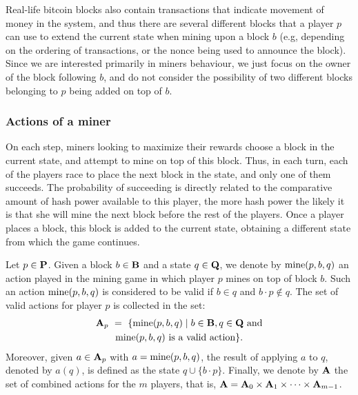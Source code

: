Real-life bitcoin blocks also contain transactions that indicate movement of money in the system, and thus there are
several different blocks that a player $p$ can use to extend the current state when mining upon a block $b$ (e.g, depending  on the ordering of transactions, or the nonce being used to announce the block). Since we are interested primarily in miners behaviour, we just focus on the owner of the block following $b$, and do not consider the possibility of two different blocks belonging to $p$ being added on top of $b$. 

\subsubsection{Actions of a miner}\label{sub:actions}
On each step, miners looking to maximize their rewards choose a block in the current state, and attempt to mine on top of this block. Thus, in each turn, each of the players race to place the next block in the state, and only one of them succeeds. The probability of succeeding is directly related to the comparative amount of hash power available to this player, the more hash power the likely it is that she will mine the next block before the rest of the players. Once a player places a block, this block is added to the current state, obtaining a different state from which the game continues.

Let $p \in \mathbf{P}$. Given a block $b \in \mathbf{B}$ and a state $q \in \mathbf{Q}$, we denote by $\text{\rm mine}(p,b,q)$ an action played in the mining game in which player $p$ mines on top of block $b$. Such an action $\text{\rm mine}(p,b,q)$ is considered to be valid if $b \in q$ and $b\cdot p \not\in q$. The set of valid actions for player $p$ is collected in the set:
\begin{multline*}
\mathbf{A}_p \ = \ \{ \text{\rm mine}(p,b,q) \mid b \in \mathbf{B}, q \in \mathbf{Q} \text{ and}\\\text{\rm mine}(p,b,q) \text{ is a valid action}\}.
\end{multline*}
Moreover, given $a \in \mathbf{A}_p$ with $a = \text{\rm mine}(p,b,q)$, the result of applying $a$ to $q$, denoted by $a(q)$, is defined as the state $q \cup \{b \cdot p\}$. Finally, we denote by $\mathbf{A}$ the set of combined actions for the $m$ players, that is, $\mathbf{A} = \mathbf{A}_0 \times \mathbf{A}_1 \times \cdots \times \mathbf{A}_{m-1}$.

